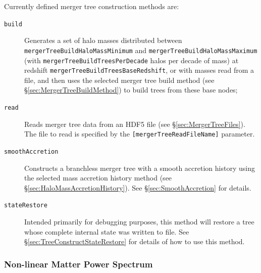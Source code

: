 Currently defined merger tree construction methods are:
\begin{description}
 \item [{\tt build}] Generates a set of halo masses distributed between {\tt mergerTreeBuildHaloMassMinimum} and {\tt mergerTreeBuildHaloMassMaximum} (with {\tt mergerTreeBuildTreesPerDecade} halos per decade of mass) at redshift {\tt mergerTreeBuildTreesBaseRedshift}, or with masses read from a file, and then uses the selected merger tree build method (see \S\ref{sec:MergerTreeBuildMethod}) to build trees from these base nodes;
 \item [{\tt read}] Reads merger tree data from an HDF5 file (see \S\ref{sec:MergerTreeFiles}). The file to read is specified by the {\tt [mergerTreeReadFileName]} parameter.
 \item [{\tt smoothAccretion}] Constructs a branchless merger tree with a smooth accretion history using the selected mass accretion history method (see \S\ref{sec:HaloMassAccretionHistory}). See \S\ref{sec:SmoothAccretion} for details.
 \item [{\tt stateRestore}] Intended primarily for debugging purposes, this method will restore a tree whose complete internal state was written to file. See \S\ref{sec:TreeConstructStateRestore} for details of how to use this method.
\end{description}

\subsubsection{Non-linear Matter Power Spectrum}

